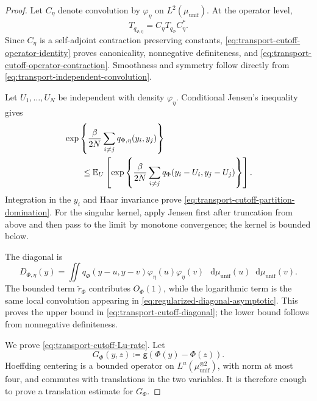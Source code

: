 \documentclass[11pt,reqno]{amsart}
\numberwithin{equation}{section}
\theoremstyle{plain}
\theoremstyle{definition}
\newcommand{\dd}{\mathop{}\!\mathrm d}
\newcommand{\E}{\mathbb E}
\newcommand{\be}{\beta}
\newcommand{\g}{\mathsf g}
\newcommand{\tl}{\widetilde}
\newcommand{\muunif}{\mu_{\mathrm{unif}}}
\begin{document}
\begin{proof}
Let $C_\eta$ denote convolution by $\varphi_\eta$ on $L^2(\muunif)$.  At the operator level,
\begin{equation}
 T_{q_{\Phi,\eta}}=C_\eta T_{q_\Phi}C_\eta^*.
 \label{eq:transport-cutoff-operator-identity}
\end{equation}
Since $C_\eta$ is a self-adjoint contraction preserving constants, \eqref{eq:transport-cutoff-operator-identity} proves canonicality, nonnegative definiteness, and \eqref{eq:transport-cutoff-operator-contraction}.  Smoothness and symmetry follow directly from \eqref{eq:transport-independent-convolution}.

Let $U_1,\ldots,U_N$ be independent with density $\varphi_\eta$.  Conditional Jensen's inequality gives
\begin{align}
 &\exp\left\{\frac\be{2N}\sum_{i\neq j}
 q_{\Phi,\eta}(y_i,y_j)\right\}
 \notag\\
 &\qquad\leq
 \E_U\left[
 \exp\left\{\frac\be{2N}\sum_{i\neq j}
 q_\Phi(y_i-U_i,y_j-U_j)\right\}\right].
 \label{eq:transport-cutoff-Jensen}
\end{align}
Integration in the $y_i$ and Haar invariance prove \eqref{eq:transport-cutoff-partition-domination}.  For the singular kernel, apply Jensen first after truncation from above and then pass to the limit by monotone convergence; the kernel is bounded below.

The diagonal is
\begin{equation}
 D_{\Phi,\eta}(y)
 =\iint q_\Phi(y-u,y-v)
 \varphi_\eta(u)\varphi_\eta(v)\,\dd\muunif(u)\dd\muunif(v).
 \label{eq:transport-cutoff-diagonal-integral}
\end{equation}
The bounded term $\tl r_\Phi$ contributes $O_\Phi(1)$, while the logarithmic term is the same local convolution appearing in \eqref{eq:regularized-diagonal-asymptotic}.  This proves the upper bound in \eqref{eq:transport-cutoff-diagonal}; the lower bound follows from nonnegative definiteness.

We prove \eqref{eq:transport-cutoff-Lu-rate}.  Let
\begin{equation}
 G_\Phi(y,z)\coloneqq\g(\Phi(y)-\Phi(z)).
 \label{eq:transport-raw-pulled-kernel}
\end{equation}
Hoeffding centering is a bounded operator on $L^u(\muunif^{\otimes2})$, with norm at most four, and commutes with translations in the two variables.  It is therefore enough to prove a translation estimate for $G_\Phi$.


\end{proof}
\end{document}
